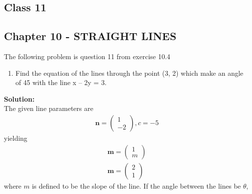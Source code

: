 \documentclass[10pt,a4paper]{report}
\newcommand{\myvec}[1]{\ensuremath{\begin{pmatrix}#1\end{pmatrix}}}
\let\vec\mathbf
\let\vec\mathbf
\renewcommand{\vec}[1]{\textbf{#1}}
\begin{document}
\onehalfspacing
\begin{center}
	\section*{\textbf{Class 11}}
	\subsection*{Chapter 10 - STRAIGHT LINES}
\end{center}
The following problem is question 11 from exercise 10.4
\begin{enumerate}
    \item Find the equation of the lines through the point (3, 2) which make an angle of 45\textdegree \hspace{0.1cm} with the line x – 2y = 3.
\end{enumerate}
\textbf{Solution:}\\
The given line parameters are
\begin{align}
   \vec{n}=\myvec{1\\-2},c=-5
\end{align}
yielding
\begin{align}
\vec{m}=\myvec{1\\m}\\
\vec{m}=\myvec{2\\1}
\end{align}
where  $m$ is defined to be the slope of the line. If the angle between the lines be $\theta$,\\
\end{document}
